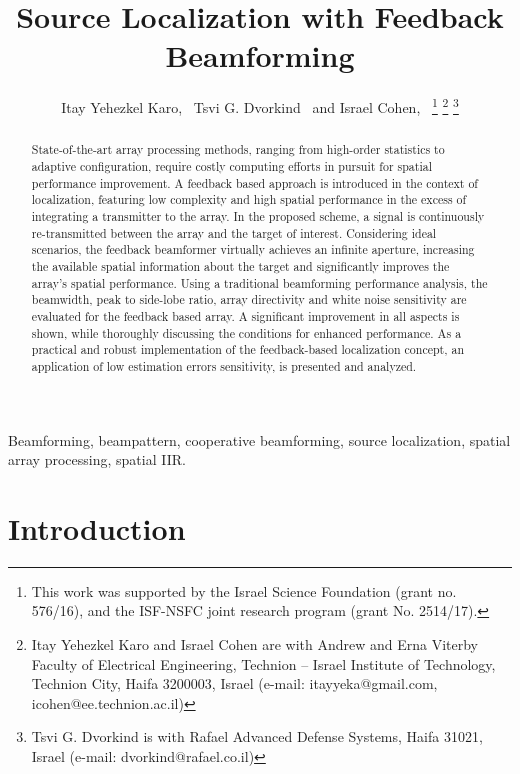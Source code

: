 \documentclass[journal]{IEEEtran}
\begin{document}
\title{Source Localization with Feedback Beamforming}
\author{Itay Yehezkel Karo,~\IEEEmembership{}
        Tsvi G. Dvorkind~\IEEEmembership{}
        and 
        Israel Cohen,~
\thanks{This work was supported by the Israel Science Foundation (grant no. 576/16), and the ISF-NSFC joint research program (grant No. 2514/17).}
\thanks{Itay Yehezkel Karo and Israel Cohen are with Andrew and Erna Viterby Faculty of Electrical Engineering, Technion -- Israel Institute of Technology, Technion City, Haifa 3200003, Israel (e-mail: itayyeka@gmail.com, icohen@ee.technion.ac.il)}%
\thanks{Tsvi G. Dvorkind is with Rafael Advanced Defense Systems, Haifa 31021, Israel (e-mail: dvorkind@rafael.co.il)}%
}
\markboth{}%
{}
\maketitle
\begin{abstract}
State-of-the-art array processing methods, ranging from high-order statistics to adaptive configuration, require costly computing efforts in pursuit for spatial performance improvement.
A feedback based approach is introduced in the context of localization, featuring low complexity and high spatial performance in the excess of integrating a transmitter to the array.  
In the proposed scheme, a signal is continuously re-transmitted between the array and the target of interest.
Considering ideal scenarios, the feedback beamformer virtually achieves an infinite aperture, increasing the available spatial information about the target and significantly improves the array's spatial performance.
Using a traditional beamforming performance analysis, the beamwidth, peak to side-lobe ratio, array directivity and white noise sensitivity are evaluated for the feedback based array.
A significant improvement in all aspects is shown, while thoroughly discussing the conditions for enhanced performance.
As a practical and robust implementation of the feedback-based localization concept, an application of low estimation errors sensitivity, 
is presented and analyzed.
\end{abstract}
\begin{IEEEkeywords}
Beamforming, beampattern, cooperative beamforming, source localization, spatial array processing, spatial IIR.
\end{IEEEkeywords}
\section{Introduction}

\end{document}
